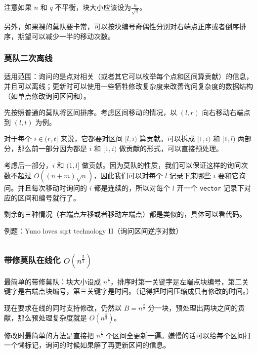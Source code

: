 注意如果 $n$ 和 $q$ 不平衡，块大小应该设为$\frac n {\sqrt q}$。

另外，如果裸的莫队要卡常，可以按块编号奇偶性分别对右端点正序或者倒序排序，期望可以减少一半的移动次数。


\subsubsection{莫队二次离线}

适用范围：询问的是点对相关（或者其它可以枚举每个点和区间算贡献）的信息，并且可以离线；更新时可以使用一些牺牲修改复杂度来改善询问复杂度的数据结构（如单点修改询问区间和）。

先按照普通的莫队将区间排序。考虑区间移动的情况，以 $(l, r)$ 向右移动右端点到 $(l, t)$ 为例。

对于每个 $i \in (r, t]$ 来说，它都要对区间 $[l, i)$ 算贡献。可以拆成 $[1, i)$ 和 $[1, l)$ 两部分，那么前一部分因为都是 $i$ 和 $[1, i)$ 做贡献的形式，可以直接预处理。

考虑后一部分，$i$ 和 $(1, l]$ 做贡献。因为莫队的性质，我们可以保证这样的询问次数不超过 $O((n + m)\sqrt n)$，因此我们可以对每个 $l$ 记录下来哪些 $i$ 要和它询问。并且每次移动时询问的 $i$ 都是连续的，所以对每个 $l$ 开一个 \texttt{vector} 记录下对应的区间和编号就行了。

剩余的三种情况（右端点左移或者移动左端点）都是类似的，具体可以看代码。

例题：Yuno loves sqrt technology II（询问区间逆序对数）

\inputminted{cpp}{../src/datastructure/莫队二次离线.cpp}

\subsubsection{带修莫队在线化 $O(n ^ {\frac 5 3})$}

最简单的带修莫队：块大小设成 $n^{\frac 2 3}$，排序时第一关键字是左端点块编号，第二关键字是右端点块编号，第三关键字是时间。（记得把时间压缩成只有修改的时间。）

现在要求在线的同时支持修改，仍然以 $B = n^{\frac 2 3}$ 分一块，预处理出两块之间的贡献，那么预处理复杂度就是 $O(n ^ {\frac 5 3})$。

修改时最简单的方法是直接把 $n^{\frac 2 3}$ 个区间全更新一遍。嫌慢的话可以给每个区间打一个懒标记，询问的时候如果解了再更新区间的信息。

